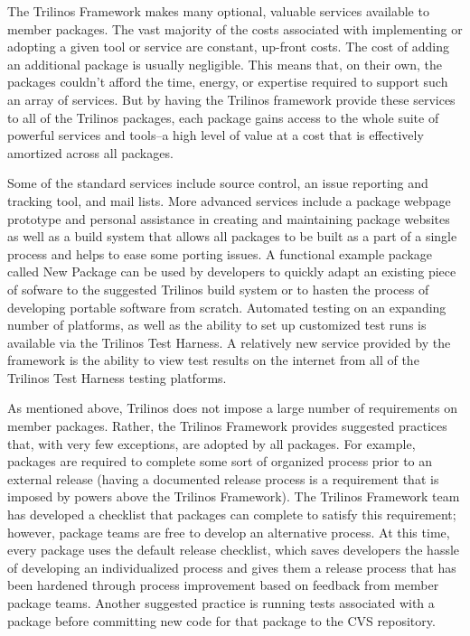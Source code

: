 \documentclass[12pt,relax]{article}
\begin{document}
The Trilinos Framework makes many optional, valuable services available to
member packages.  The vast majority of the costs associated with implementing
or adopting a given tool or service are constant, up-front costs.  The cost of
adding an additional package is usually negligible.  This means that, on their
own, the packages couldn't afford the time, energy, or expertise required to
support such an array of services.  But by having the Trilinos framework
provide these services to all of the Trilinos packages, each package gains
access to the whole suite of powerful services and tools--a high level of value
at a cost that is effectively amortized across all packages.

Some of the standard services include source control, an issue reporting and
tracking tool, and mail lists.  More advanced services include a package
webpage prototype and personal assistance in creating and maintaining package
websites as well as a build system that allows all packages to be built as a
part of a single process and helps to ease some porting issues.  A functional
example package called New Package can be used by developers to quickly adapt
an existing piece of sofware to the suggested Trilinos build system or to 
hasten the process of developing portable software from scratch.  Automated 
testing on an expanding number of platforms, as well as the ability to set up 
customized test runs is available via the Trilinos Test Harness.  A relatively 
new service provided by  the framework is the ability to view test results 
on the internet from all of the Trilinos Test Harness testing platforms.

As mentioned above, Trilinos does not impose a large number of requirements
on member packages.  Rather, the Trilinos Framework provides suggested 
practices that, with very few exceptions, are adopted by all packages.
For example, packages are required to complete some sort of organized
process prior to an external release (having a documented release
process is a requirement that is imposed by powers above the Trilinos
Framework).  The Trilinos Framework team has developed a checklist that
packages can complete to satisfy this requirement; however, package teams
are free to develop an alternative process.  At this time, every package
uses the default release checklist, which saves developers the hassle of
developing an individualized process and gives them a release process that
has been hardened through process improvement based on feedback from
member package teams.  Another suggested practice is running tests
associated with a package before committing new code for that package to the 
CVS repository.
\end{document}

